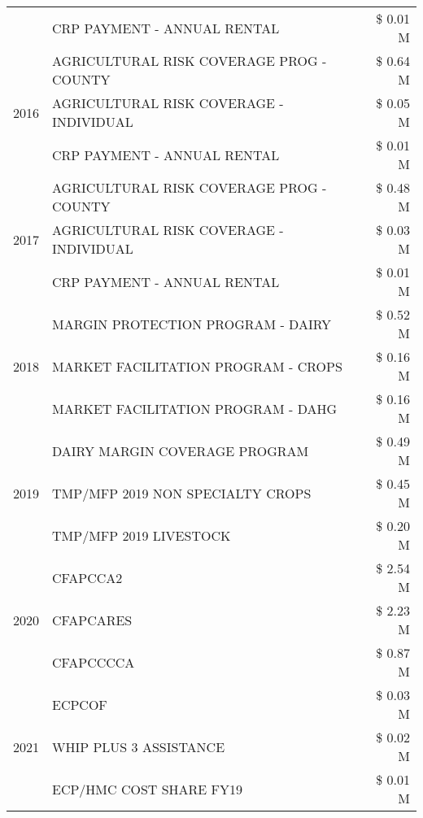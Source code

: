 \begin{tabular}{llr}
 & CRP PAYMENT - ANNUAL RENTAL & \$ 0.01 M \\
\cline{1-3}
\multirow[t]{3}{*}{2016} & AGRICULTURAL RISK COVERAGE PROG - COUNTY & \$ 0.64 M \\
 & AGRICULTURAL RISK COVERAGE - INDIVIDUAL & \$ 0.05 M \\
 & CRP PAYMENT - ANNUAL RENTAL & \$ 0.01 M \\
\cline{1-3}
\multirow[t]{3}{*}{2017} & AGRICULTURAL RISK COVERAGE PROG - COUNTY & \$ 0.48 M \\
 & AGRICULTURAL RISK COVERAGE - INDIVIDUAL & \$ 0.03 M \\
 & CRP PAYMENT - ANNUAL RENTAL & \$ 0.01 M \\
\cline{1-3}
\multirow[t]{3}{*}{2018} & MARGIN PROTECTION PROGRAM - DAIRY & \$ 0.52 M \\
 & MARKET FACILITATION PROGRAM - CROPS & \$ 0.16 M \\
 & MARKET FACILITATION PROGRAM - DAHG & \$ 0.16 M \\
\cline{1-3}
\multirow[t]{3}{*}{2019} & DAIRY MARGIN COVERAGE PROGRAM & \$ 0.49 M \\
 & TMP/MFP 2019 NON SPECIALTY CROPS & \$ 0.45 M \\
 & TMP/MFP 2019 LIVESTOCK & \$ 0.20 M \\
\cline{1-3}
\multirow[t]{3}{*}{2020} & CFAPCCA2 & \$ 2.54 M \\
 & CFAPCARES & \$ 2.23 M \\
 & CFAPCCCCA & \$ 0.87 M \\
\cline{1-3}
\multirow[t]{3}{*}{2021} & ECPCOF & \$ 0.03 M \\
 & WHIP PLUS 3 ASSISTANCE & \$ 0.02 M \\
 & ECP/HMC COST SHARE FY19 & \$ 0.01 M \\
\cline{1-3}
\bottomrule
\end{tabular}
